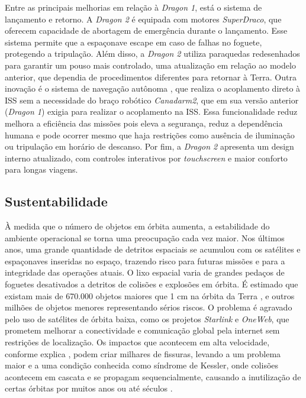 Entre as principais melhorias em relação à \emph{Dragon 1}, está o sistema de lançamento e retorno. A \emph{Dragon 2} é equipada com motores \emph{SuperDraco}, que oferecem capacidade de abortagem de emergência durante o lançamento.
Esse sistema permite que a espaçonave escape em caso de falhas no foguete, protegendo a tripulação. Além disso, a \emph{Dragon 2} utiliza paraquedas redesenhados para garantir um pouso mais controlado, uma atualização em relação ao modelo anterior, que dependia de procedimentos diferentes para retornar à Terra.
Outra inovação é o sistema de navegação autônoma \cite{nasaStarshipDocking}, que realiza o acoplamento direto à ISS sem a necessidade do braço robótico \emph{Canadarm2}, que em sua versão anterior (\emph{Dragon 1}) exigia para realizar o acoplamento na ISS.
Essa funcionalidade reduz melhora a eficiência das missões pois eleva a segurança, reduz a dependência humana e pode ocorrer mesmo que haja restrições como ausência de iluminação ou tripulação em horário de descanso.
Por fim, a \emph{Dragon 2} apresenta um design interno atualizado, com controles interativos por \emph{touchscreen} e maior conforto para longas viagens.

\subsection{Sustentabilidade}

À medida que o número de objetos em órbita aumenta, a estabilidade do ambiente operacional se torna uma preocupação cada vez maior.
Nos últimos anos, uma grande quantidade de detritos espaciais se acumulou com os satélites e espaçonaves inseridas no espaço, trazendo risco para futuras missões e para a integridade das operações atuais.
O lixo espacial varia de grandes pedaços de foguetes desativados a detritos de colisões e explosões em órbita.
É estimado que existam mais de 670.000 objetos maiores que 1 cm na órbita da Terra \cite{esaSpaceDebris}, e outros milhões de objetos menores representando sérios riscos.
O problema é agravado pelo uso de satélites de órbita baixa, como os projetos \emph{Starlink} e \emph{OneWeb}, que prometem melhorar a conectividade e comunicação global pela internet sem restrições de localização.
Os impactos que acontecem em alta velocidade, conforme explica \cite{esaAboutSpaceDebris}, podem criar milhares de fissuras, levando a um problema maior e a uma condição conhecida como síndrome de Kessler, onde colisões acontecem em cascata e se propagam sequencialmente, causando a inutilização de certas órbitas por muitos anos ou até séculos \cite{kessler1978}.

